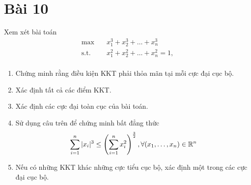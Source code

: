 \section{Bài 10}

Xem xét bài toán
\begin{equation}
    \begin{aligned}
        \max \quad & x_1^3 + x_2^3 + \dots + x_n^3\\
        \textrm{s.t.} \quad & x_1^2 + x_2^2 + \dots + x_n^2 = 1,\\
    \end{aligned}
\end{equation}
\begin{enumerate}[label=(\alph*)]
    \item Chứng minh rằng điều kiện KKT phải thỏa mãn tại mỗi cực đại cục bộ.
    \item Xác định tất cả các điểm KKT.
    \item Xác định các cực đại toàn cục của bài toán.
    \item Sử dụng câu trên để chứng minh bất đẳng thức
    \begin{equation}
        \sum_{i=1}^n| x_i|^3 \leq \left(\sum_{i=1}^nx_i^2\right)^{\frac{3}{2}}, \forall (x_1, \dots, x_n) \in \mathbb{R}^n
    \end{equation}
    \item Nếu có những KKT khác những cực tiểu cục bộ, xác định một trong các cực đại cục bộ.
\end{enumerate}


